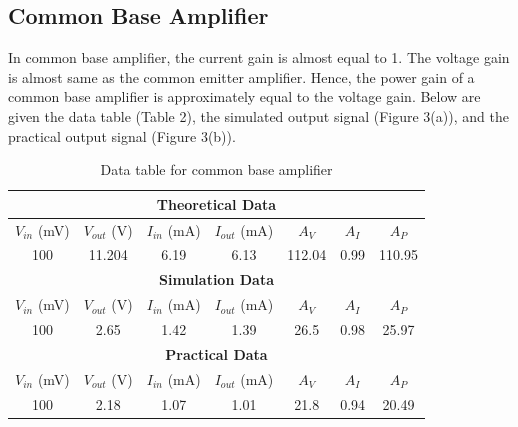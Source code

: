 \documentclass[12pt]{article}
\begin{document}
\subsection{Common Base Amplifier}
In common base amplifier, the current gain is almost equal to 1. The voltage gain is almost same as the common emitter amplifier. Hence, the power gain of a common base amplifier is approximately equal to the voltage gain. Below are given the data table (Table 2), the simulated output signal (Figure 3(a)), and the practical output signal (Figure 3(b)).

\bgroup
\def\arraystretch{1.5}
\begin{table}[h!]
    \centering
    \caption{Data table for common base amplifier}
    \label{tab:CB table}
    \begin{tabular}{|c|c|c|c|c|c|c|}
        \hline
        \multicolumn{7}{|c|}{\textbf{Theoretical Data}} \\
        \hline
        $V_{in}$ (mV) & $V_{out}$ (V) & $I_{in}$ (mA) & $I_{out}$ (mA) & $A_V$ & $A_I$ & $A_P$ \\ \hline
        100 & 11.204 & 6.19 & 6.13 & 112.04 & 0.99 & 110.95 \\ \hline\hline
        \multicolumn{7}{|c|}{\textbf{Simulation Data}} \\
        \hline
        $V_{in}$ (mV) & $V_{out}$ (V) & $I_{in}$ (mA) & $I_{out}$ (mA) & $A_V$ & $A_I$ & $A_P$ \\ \hline
        100 & 2.65 & 1.42 & 1.39 & 26.5 & 0.98 & 25.97 \\ \hline\hline
        \multicolumn{7}{|c|}{\textbf{Practical Data}} \\
        \hline
        $V_{in}$ (mV) & $V_{out}$ (V) & $I_{in}$ (mA) & $I_{out}$ (mA) & $A_V$ & $A_I$ & $A_P$ \\ \hline
        100 & 2.18 & 1.07 & 1.01 & 21.8 & 0.94 & 20.49 \\ \hline
    \end{tabular}
\end{table}
\egroup
\end{document}
